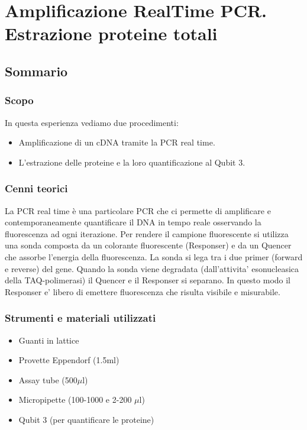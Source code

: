 \section{\LARGE{Amplificazione RealTime PCR. Estrazione proteine totali}}

\vspace{0.6cm}

\subsection{Sommario}

\subsubsection{Scopo}

In questa esperienza vediamo due procedimenti:
\begin{itemize}
  \item Amplificazione di un cDNA tramite la PCR real time.
  \item L'estrazione delle proteine e la loro quantificazione al Qubit 3.
\end{itemize}

\subsubsection{Cenni teorici}

La PCR real time è una particolare PCR che ci permette di amplificare e
contemporaneamente quantificare il DNA in tempo reale osservando la fluorescenza
ad ogni iterazione.
Per rendere il campione fluorescente si utilizza una sonda composta da un colorante
fluorescente (Responser) e da un Quencer che assorbe l'energia della fluorescenza.
La sonda si lega tra i due primer (forward e reverse) del gene.
Quando la sonda viene degradata (dall'attivita' esonucleasica della TAQ-polimerasi)
il Quencer e il Responser si separano. In questo modo il Responser e' libero di emettere
fluorescenza che risulta visibile e misurabile.

\subsubsection{Strumenti e materiali utilizzati}

\begin{itemize}
\item Guanti in lattice
\item Provette Eppendorf (1.5ml)
\item Assay tube (500$\mu$l)
\item Micropipette (100-1000  e 2-200 $\mu$l)
\item Qubit 3 (per quantificare le proteine)
\end{itemize}

